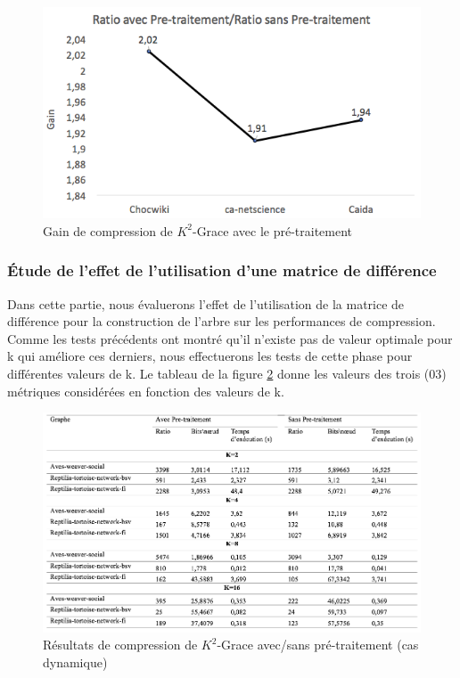 \begin{figure}[H]
	\centering
	\includegraphics[scale=0.5]{ressources/image/gain.png}
	
	\caption{Gain de compression de $K^2$-Grace avec le pré-traitement}
	\label{fig:gain }
\end{figure}


\subsubsection{Étude de l'effet de l'utilisation d'une matrice de différence}

Dans cette partie, nous évaluerons l'effet de l'utilisation de la matrice de différence pour la construction de l'arbre sur les performances de compression. Comme les tests précédents ont montré  qu'il n'existe pas de valeur optimale pour k qui améliore ces derniers, nous effectuerons les tests de cette phase pour différentes valeurs de k. Le tableau de la figure \ref{res-dyn-tst} donne les valeurs des trois (03) métriques considérées en fonction des valeurs de k.


\begin{figure}[H]
	\centering
	\includegraphics[scale=0.48]{ressources/image/ik2.png}
	\caption{Résultats de compression de $K^2$-Grace avec/sans pré-traitement (cas dynamique)}
	\label{res-dyn-tst}
\end{figure}

